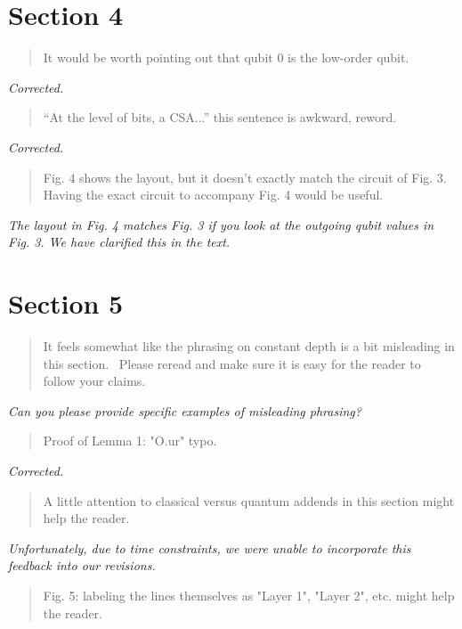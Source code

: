 \documentclass{article}
\theoremstyle{plain} \newtheorem{lemma}{Lemma}
\begin{document}
\section{Section 4}

\begin{quote}
It would be worth pointing out that qubit 0 is the low-order qubit.
\end{quote}

{\it Corrected.}

\begin{quote}
``At the level of bits, a CSA...'' this sentence is awkward, reword.
\end{quote}

{\it Corrected.}

\begin{quote}
Fig. 4 shows the layout, but it doesn't exactly match the circuit of
Fig. 3.  Having the exact circuit to accompany Fig. 4 would be useful.
\end{quote}

{\it The layout in Fig. 4 matches Fig. 3 if you look at the outgoing qubit values in Fig. 3.  We have clarified this in the text.}

\section{Section 5}

\begin{quote}
It feels somewhat like the phrasing on constant depth is a bit
misleading in this section.  Please reread and make sure it is easy
for the reader to follow your claims.
\end{quote}

{\it Can you please provide specific examples of misleading phrasing?}

\begin{quote}
Proof of Lemma 1: "O.ur" typo.
\end{quote}

{\it Corrected.}

\begin{quote}
A little attention to classical versus quantum addends in this section
might help the reader.
\end{quote}

{\it Unfortunately, due to time constraints, we were unable to incorporate this feedback into our revisions.}

\begin{quote}
Fig. 5: labeling the lines themselves as "Layer 1", "Layer 2",
etc. might help the reader.
\end{quote}
\end{document}
